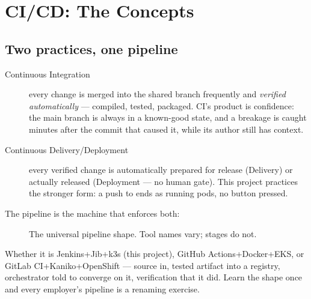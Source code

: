 \chapter{CI/CD: The Concepts}
\label{ch:cicd}

\section{Two practices, one pipeline}

\begin{description}
  \item[Continuous Integration] every change is merged into the shared
  branch frequently and \emph{verified automatically} --- compiled,
  tested, packaged. CI's product is confidence: the main branch is
  always in a known-good state, and a breakage is caught minutes after
  the commit that caused it, while its author still has context.
  \item[Continuous Delivery/Deployment] every verified change is
  automatically prepared for release (Delivery) or actually released
  (Deployment --- no human gate). This project practices the stronger
  form: a push to  ends as running pods, no button pressed.
\end{description}

The pipeline is the machine that enforces both:

\begin{figure}[h]
\centering
{}
\caption{The universal pipeline shape. Tool names vary; stages do not.}
\end{figure}

Whether it is Jenkins+Jib+k3s (this project), GitHub
Actions+Docker+EKS, or GitLab CI+Kaniko+OpenShift --- source in, tested
artifact into a registry, orchestrator told to converge on it,
verification that it did. Learn the shape once and every employer's
pipeline is a renaming exercise.

